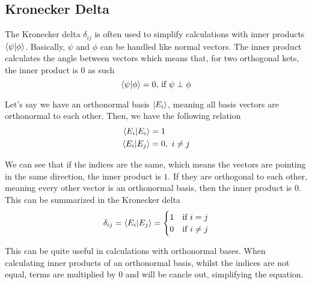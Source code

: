 \subsection{Kronecker Delta}
The Kronecker delta $\delta_{ij}$ is often used to simplify calculations with inner products $\braket{\psi | \phi}$.
Basically, $\psi$ and $\phi$ can be handled like normal vectors. 
The inner product calculates the angle between vectors which means that, for two orthogonal kets, the inner product is $0$ as such
\begin{equation}
\braket{\psi|\phi} = 0 \text{, if } \psi \perp \phi\\
\end{equation}

Let's say we have an orthonormal basis $\ket{E_i}$, meaning all basis vectors are orthonormal to each other.
Then, we have the following relation
\begin{equation}
\begin{split}
\braket{E_i|E_i} &= 1\\
\braket{E_i|E_j} &= 0, \ i\neq j
\end{split}
\end{equation}

We can see that if the indices are the same, which means the vectors are pointing in the same direction, the inner product is $1$.
If they are orthogonal to each other, meaning every other vector is an orthonormal basis, then the inner product is $0$.
This can be summarized in the Kronecker delta
\begin{equation}
    \delta_{ij} = \braket{E_i|E_j} = \begin{cases} 1 & \text{if } i=j\\ 0 & \text{if } i \neq j
\end{cases}
\end{equation}

This can be quite useful in calculations with orthonormal bases.
When calculating inner products of an orthonormal basis, whilst the indices are not equal, terms are multiplied by $0$ and will be cancle out, simplifying the equation.

